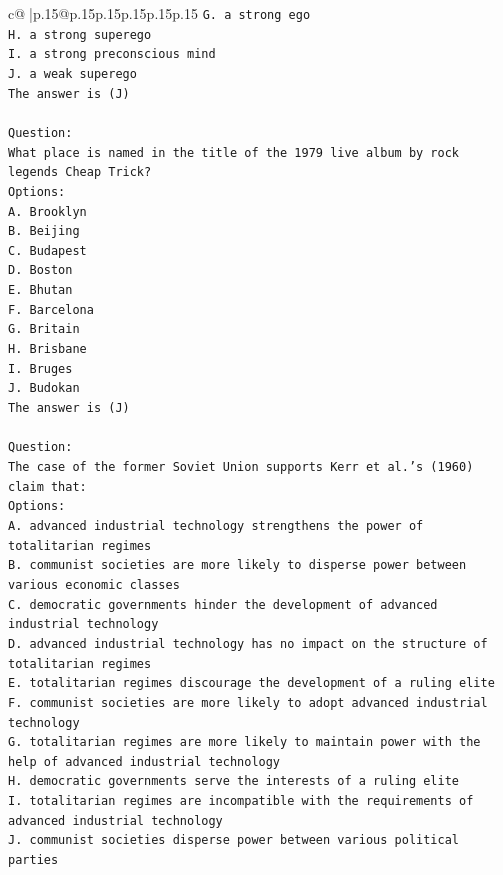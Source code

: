 \documentclass{article}
\begin{document}
{\begin{supertabular}{c@{$\;$}|p{.15\linewidth}@{}p{.15\linewidth}p{.15\linewidth}p{.15\linewidth}p{.15\linewidth}p{.15\linewidth}}
{{{\texttt{G. a strong ego} \\
\texttt{H. a strong superego} \\
\texttt{I. a strong preconscious mind} \\
\texttt{J. a weak superego} \\
\texttt{The answer is (J)} \\
\\ 
\texttt{Question:} \\
\texttt{What place is named in the title of the 1979 live album by rock legends Cheap Trick?} \\
\texttt{Options:} \\
\texttt{A. Brooklyn} \\
\texttt{B. Beijing} \\
\texttt{C. Budapest} \\
\texttt{D. Boston} \\
\texttt{E. Bhutan} \\
\texttt{F. Barcelona} \\
\texttt{G. Britain} \\
\texttt{H. Brisbane} \\
\texttt{I. Bruges} \\
\texttt{J. Budokan} \\
\texttt{The answer is (J)} \\
\\ 
\texttt{Question:} \\
\texttt{The case of the former Soviet Union supports Kerr et al.'s (1960) claim that:} \\
\texttt{Options:} \\
\texttt{A. advanced industrial technology strengthens the power of totalitarian regimes} \\
\texttt{B. communist societies are more likely to disperse power between various economic classes} \\
\texttt{C. democratic governments hinder the development of advanced industrial technology} \\
\texttt{D. advanced industrial technology has no impact on the structure of totalitarian regimes} \\
\texttt{E. totalitarian regimes discourage the development of a ruling elite} \\
\texttt{F. communist societies are more likely to adopt advanced industrial technology} \\
\texttt{G. totalitarian regimes are more likely to maintain power with the help of advanced industrial technology} \\
\texttt{H. democratic governments serve the interests of a ruling elite} \\
\texttt{I. totalitarian regimes are incompatible with the requirements of advanced industrial technology} \\
\texttt{J. communist societies disperse power between various political parties} \\
            }
        }
    }
     \\ \\


\end{supertabular}}
\end{document}
